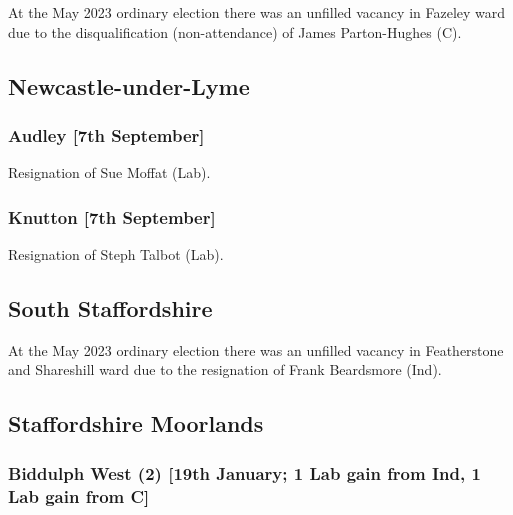 \documentclass[a4paper,openany]{book}
\begin{document}
\begin{resultsiii}
At the May 2023 ordinary election there was an unfilled vacancy in Fazeley ward due to the disqualification (non-attendance) of James Parton-Hughes (C).%

\subsection*{Newcastle-under-Lyme}

\subsubsection*{Audley \hspace*{\fill}\nolinebreak[1]%
	\enspace\hspace*{\fill}
	[7th September]}


Resignation of Sue Moffat (Lab).

\subsubsection*{Knutton \hspace*{\fill}\nolinebreak[1]%
	\enspace\hspace*{\fill}
	[7th September]}


Resignation of Steph Talbot (Lab).

\subsection*{South Staffordshire}

At the May 2023 ordinary election there was an unfilled vacancy in Featherstone and Shareshill ward due to the resignation of Frank Beardsmore (Ind).%

\subsection*{Staffordshire Moorlands}

\subsubsection*{Biddulph West (2) \hspace*{\fill}\nolinebreak[1]%
	\enspace\hspace*{\fill}
	[19th January; 1 Lab gain from Ind, 1 Lab gain from C]}


\end{resultsiii}
\end{document}
